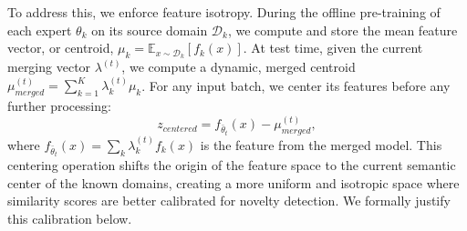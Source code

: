 \documentclass[twoside]{article}
\begin{document}
To address this, we enforce feature isotropy. During the offline pre-training of each expert $\theta_k$ on its source domain $\mathcal{D}_k$, we compute and store the mean feature vector, or centroid, $\mu_k = \mathbb{E}_{x \sim \mathcal{D}_k}[f_k(x)]$. At test time, given the current merging vector $\lambda^{(t)}$, we compute a dynamic, merged centroid $\mu_{merged}^{(t)} = \sum_{k=1}^K \lambda_k^{(t)} \mu_k$. For any input batch, we center its features before any further processing:
\begin{equation}
z_{centered} = f_{\bar{\theta}_t}(x) - \mu_{merged}^{(t)},
\label{eq:ifc}
\end{equation}
where $f_{\bar{\theta}_t}(x) = \sum_k \lambda_k^{(t)} f_k(x)$ is the feature from the merged model. This centering operation shifts the origin of the feature space to the current semantic center of the known domains, creating a more uniform and isotropic space where similarity scores are better calibrated for novelty detection. We formally justify this calibration below.
\end{document}
